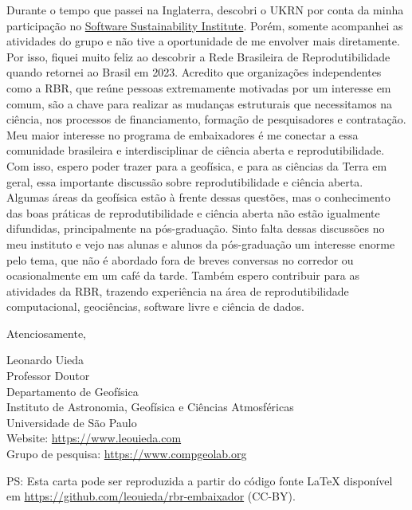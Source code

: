 \documentclass[a4paper,onecolumn,10pt]{article}
\newcommand{\Nome}{Leonardo Uieda}
\newcommand{\Cargo}{Professor Doutor}
\newcommand{\Padding}{\vspace{0.5cm}}
\begin{document}
Durante o tempo que passei na Inglaterra, descobri o UKRN por conta  da minha
participação no
\href{https://www.leouieda.com/blog/ssi-fellowship.html}{Software
Sustainability Institute}.
Porém, somente acompanhei as atividades do grupo e não tive a oportunidade de
me envolver mais diretamente.
Por isso, fiquei muito feliz ao descobrir a Rede Brasileira de Reprodutibilidade
quando retornei ao Brasil em 2023.
Acredito que organizações independentes como a RBR, que reúne pessoas
extremamente motivadas por um interesse em comum, são a chave para realizar as
mudanças estruturais que necessitamos na ciência, nos processos de
financiamento, formação de pesquisadores e contratação.
Meu maior interesse no programa de embaixadores é me conectar a essa comunidade
brasileira e interdisciplinar de ciência aberta e reprodutibilidade.
Com isso, espero poder trazer para a geofísica, e para as ciências da Terra em
geral, essa importante discussão sobre reprodutibilidade e ciência aberta.
Algumas áreas da geofísica estão à frente dessas questões, mas o conhecimento
das boas práticas de reprodutibilidade e ciência aberta não estão igualmente
difundidas, principalmente na pós-graduação.
Sinto falta dessas discussões no meu instituto e vejo nas alunas e alunos da
pós-graduação um interesse enorme pelo tema, que não é abordado fora de breves
conversas no corredor ou ocasionalmente em um café da tarde.
Também espero contribuir para as atividades da RBR, trazendo experiência na
área de reprodutibilidade computacional, geociências, software livre e ciência
de dados.


\Padding

\begin{flushleft}
  Atenciosamente,

  \Padding
  \Nome{}
  \\[0.25cm]
  {
    \color{mediumgray}
    \small
    \Cargo
    \\
    Departamento de Geofísica
    \\
    Instituto de Astronomia, Geofísica e Ciências Atmosféricas
    \\
    Universidade de São Paulo
    \\
    Website: \url{https://www.leouieda.com}
    \\
    Grupo de pesquisa: \url{https://www.compgeolab.org}
  }
\end{flushleft}

\Padding
\Padding
{
  \color{mediumgray}
  \noindent
  PS: Esta carta pode ser reproduzida a partir do código fonte \LaTeX{}
  disponível em \url{https://github.com/leouieda/rbr-embaixador} (CC-BY).
}
\end{document}
